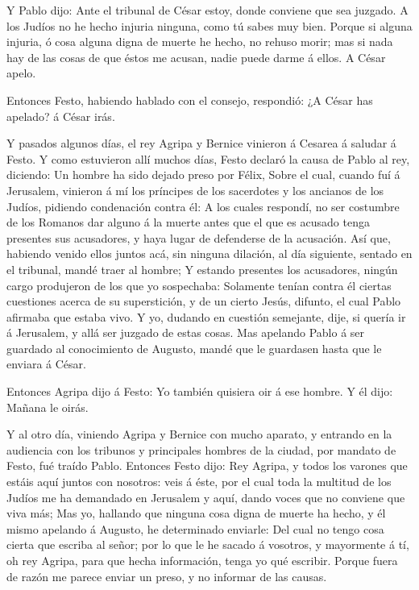  Y Pablo dijo: Ante el tribunal de César estoy, donde
conviene que sea juzgado. A los Judíos no he hecho injuria ninguna, como
tú sabes muy bien.  Porque si alguna injuria, ó cosa alguna
digna de muerte he hecho, no rehuso morir; mas si nada hay de las cosas
de que éstos me acusan, nadie puede darme á ellos. A César apelo.

 Entonces Festo, habiendo hablado con el consejo,
respondió: ¿A César has apelado? á César irás.

 Y pasados algunos días, el rey Agripa y Bernice vinieron á
Cesarea á saludar á Festo.  Y como estuvieron allí muchos
días, Festo declaró la causa de Pablo al rey, diciendo: Un hombre ha
sido dejado preso por Félix,  Sobre el cual, cuando fuí á
Jerusalem, vinieron á mí los príncipes de los sacerdotes y los ancianos
de los Judíos, pidiendo condenación contra él:  A los
cuales respondí, no ser costumbre de los Romanos dar alguno á la muerte
antes que el que es acusado tenga presentes sus acusadores, y haya lugar
de defenderse de la acusación.  Así que, habiendo venido
ellos juntos acá, sin ninguna dilación, al día siguiente, sentado en el
tribunal, mandé traer al hombre;  Y estando presentes los
acusadores, ningún cargo produjeron de los que yo sospechaba:
 Solamente tenían contra él ciertas cuestiones acerca de su
superstición, y de un cierto Jesús, difunto, el cual Pablo afirmaba que
estaba vivo.  Y yo, dudando en cuestión semejante, dije, si
quería ir á Jerusalem, y allá ser juzgado de estas cosas. 
Mas apelando Pablo á ser guardado al conocimiento de Augusto, mandé que
le guardasen hasta que le enviara á César.

 Entonces Agripa dijo á Festo: Yo también quisiera oir á
ese hombre. Y él dijo: Mañana le oirás.

 Y al otro día, viniendo Agripa y Bernice con mucho
aparato, y entrando en la audiencia con los tribunos y principales
hombres de la ciudad, por mandato de Festo, fué traído Pablo.
 Entonces Festo dijo: Rey Agripa, y todos los varones que
estáis aquí juntos con nosotros: veis á éste, por el cual toda la
multitud de los Judíos me ha demandado en Jerusalem y aquí, dando voces
que no conviene que viva más;  Mas yo, hallando que ninguna
cosa digna de muerte ha hecho, y él mismo apelando á Augusto, he
determinado enviarle:  Del cual no tengo cosa cierta que
escriba al señor; por lo que le he sacado á vosotros, y mayormente á tí,
oh rey Agripa, para que hecha información, tenga yo qué escribir.
 Porque fuera de razón me parece enviar un preso, y no
informar de las causas.

